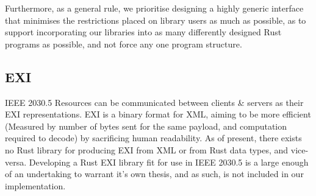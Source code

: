 Furthermore, as a general rule, we prioritise designing a highly generic interface that minimises the restrictions placed on library users as much as possible, as to support incorporating our libraries into as many differently designed Rust programs as possible, and not force any one program structure.

\subsection{EXI}
IEEE 2030.5 Resources can be communicated between clients \& servers as their EXI representations. EXI is a binary format for XML, aiming to be more efficient (Measured by number of bytes sent for the same payload, and computation required to decode) by sacrificing human readability. As of present, there exists no Rust library for producing EXI from XML or from Rust data types, and vice-versa.
Developing a Rust EXI library fit for use in IEEE 2030.5 is a large enough of an undertaking to warrant it's own thesis, and as such, is not included in our implementation.

